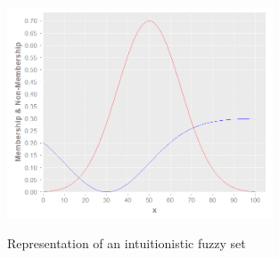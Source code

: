 \begin{figure}
\caption{Representation of an intuitionistic fuzzy set}
\centering
\includegraphics[width=0.7\textwidth]{img/example-of-ifs.png}
\label{figure:example-of-ifs}
\end{figure}
